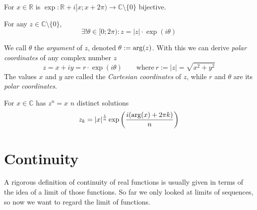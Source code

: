 \begin{theorem}
   For \(x \in \mathbb{R}\) is \(\exp: \mathbb{R} + i[x; x + 2\pi) \to \mathbb{C}\setminus\{0\}\) bijective.
\end{theorem}

\begin{theorem}
   For any \(z \in \mathbb{C}\setminus\{0\}\),
   \[\exists! \theta \in [0; 2\pi): z = \lvert z\rvert \cdot \exp(i \theta)\]
\end{theorem}
We call \(\theta\) the \emph{argument} of \(z\), denoted \(\theta := \operatorname{arg}(z)\).
With this we can derive \emph{polar coordinates} of any complex number \(z\)
\[z = x + iy = r \cdot \exp(i \theta) \qquad\text{where}~r := |z| = \sqrt{x^2 + y^2}\]
The values \(x\) and \(y\) are called the \emph{Cartesian coordinates} of \(z\), while \(r\) and \(\theta\) are its \emph{polar coordinates}.

%    

\begin{theorem}
   For \(x \in \mathbb{C}\) has \(z^n = x\) \(n\) distinct solutions
   \[z_k = \lvert x\rvert^\frac{1}{n} \exp\left(\frac{i(\operatorname{arg}(x) + 2\pi k)}{n}\right)\]
\end{theorem}

\newpage

\section{Continuity}
A rigorous definition of continuity of real functions is usually given in terms of the idea of a limit of those functions.
So far we only looked at limits of sequences, so now we want to regard the limit of functions.

